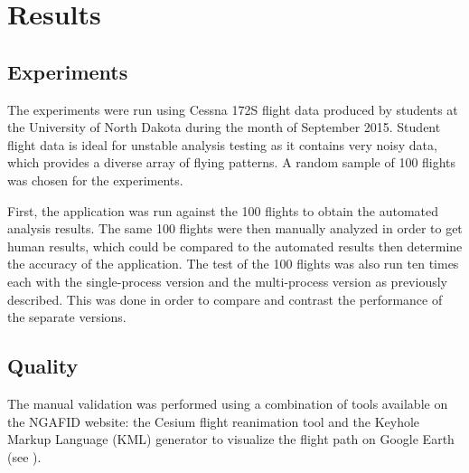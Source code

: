\chapter{Results} \label{ch:results}

\section{Experiments}

	The experiments were run using Cessna 172S flight data produced by students at the University of North Dakota during the month of September 2015.  Student flight data is ideal for unstable analysis testing as it contains very noisy data, which provides a diverse array of flying patterns.  A random sample of 100 flights was chosen for the experiments.
        
    First, the application was run against the 100 flights to obtain the automated analysis results.  The same 100 flights were then manually analyzed in order to get human results, which could be compared to the automated results then determine the accuracy of the application.  The test of the 100 flights was also run ten times each with the single-process version and the multi-process version as previously described.  This was done in order to compare and contrast the performance of the separate versions.


\section{Quality}

	The manual validation was performed using a combination of tools available on the NGAFID website:  the Cesium flight reanimation tool and the Keyhole Markup Language (KML) generator to visualize the flight path on Google Earth~\cite{nolan2014keyhole} (see ).
    
